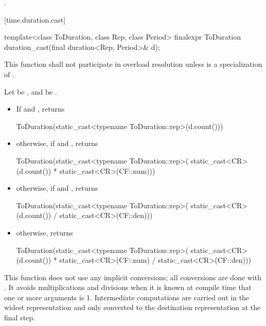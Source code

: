 \begin{itemdescr}
\pnum
\returns {}.
\end{itemdescr}

[time.duration.cast]{}

%
%
\begin{itemdecl}
template<class ToDuration, class Rep, class Period>
  finalexpr ToDuration duration_cast(final duration<Rep, Period>& d);
\end{itemdecl}

\begin{itemdescr}
\pnum
\remarks This function shall not participate in overload resolution
unless  is a specialization of .

\pnum
\returns Let  be , and  be .
\begin{itemize}
\item If  and , returns
\begin{codeblock}
ToDuration(static_cast<typename ToDuration::rep>(d.count()))
\end{codeblock}

\item otherwise, if  and , returns
\begin{codeblock}
ToDuration(static_cast<typename ToDuration::rep>(
  static_cast<CR>(d.count()) * static_cast<CR>(CF::num)))
\end{codeblock}

\item otherwise, if  and , returns
\begin{codeblock}
ToDuration(static_cast<typename ToDuration::rep>(
  static_cast<CR>(d.count()) / static_cast<CR>(CF::den)))
\end{codeblock}

\item otherwise, returns
\begin{codeblock}
ToDuration(static_cast<typename ToDuration::rep>(
  static_cast<CR>(d.count()) * static_cast<CR>(CF::num) / static_cast<CR>(CF::den)))
\end{codeblock}
\end{itemize}

\pnum
\begin{note}
This function does not use any implicit conversions; all conversions
are done with . It avoids multiplications and divisions when
it is known at compile time that one or more arguments is 1. Intermediate
computations are carried out in the widest representation and only converted to
the destination representation at the final step.
\end{note}
\end{itemdescr}

